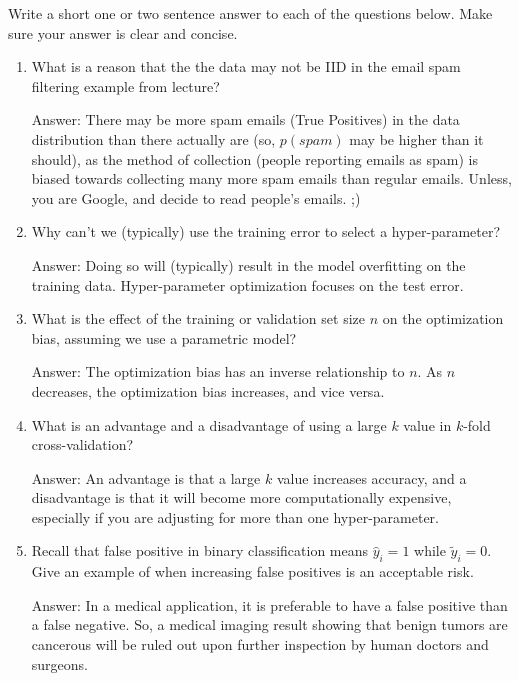 \documentclass{article}
\newcommand{\blu}[1]{{\textcolor{blu}{#1}}}
\newenvironment{answer}{\par\begingroup\color{gre}Answer: }{\endgroup}
\let\ask\blu
\begin{document}
    \ask{Write a short one or two sentence answer to each of the questions below}. Make sure your answer is clear and concise.
    \begin{enumerate}
        \item What is a reason that the the data may not be IID in the email spam filtering example from lecture?
        \begin{answer}
        There may be more spam emails (True Positives) in the data distribution than there actually are (so, $p(spam)$ may be higher than it should), as the method of collection (people reporting emails as spam) is biased towards collecting many more spam emails than regular emails. Unless, you are Google, and decide to read people's emails. ;)
        \end{answer}
        \item Why can't we (typically) use the training error to select a hyper-parameter?
        \begin{answer}
        Doing so will (typically) result in the model overfitting on the training data. Hyper-parameter optimization focuses on the test error.
        \end{answer}
        \item What is the effect of the training or validation set size $n$ on the optimization bias, assuming we use a parametric model?
        \begin{answer}
        The optimization bias has an inverse relationship to $n$. As $n$ decreases, the optimization bias increases, and vice versa.
        \end{answer}
        \item What is an advantage and a disadvantage of using a large $k$ value in $k$-fold cross-validation?
        \begin{answer}
        An advantage is that a large $k$ value increases accuracy, and a disadvantage is that it will become more computationally expensive, especially if you are adjusting for more than one hyper-parameter.
        \end{answer}
        \item Recall that false positive in binary classification means $\hat y_i=1$ while $\tilde y_i = 0$. Give an example of when increasing false positives is an acceptable risk.
        \begin{answer}
        In a medical application, it is preferable to have a false positive than a false negative. So, a medical imaging result showing that benign tumors are cancerous will be ruled out upon further inspection by human doctors and surgeons.

\end{answer}
\end{enumerate}
\end{document}
